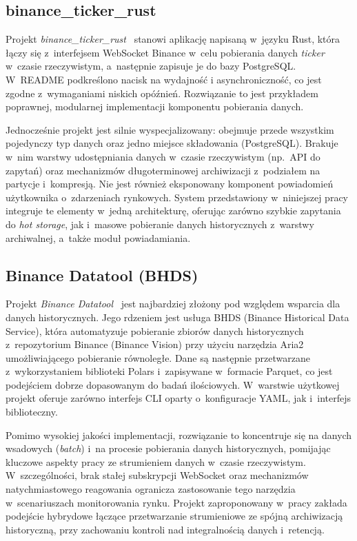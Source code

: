 \subsection{binance\_ticker\_rust}
\label{subsec:binance_ticker_rust}

Projekt \textit{binance\_ticker\_rust}~\cite{github_binance_ticker_rust} stanowi aplikację napisaną w~języku Rust,
która łączy się z~interfejsem WebSocket Binance w~celu pobierania danych \textit{ticker} w~czasie rzeczywistym,
a~następnie zapisuje je do bazy PostgreSQL\@.
W~README podkreślono nacisk na wydajność i asynchroniczność, co jest zgodne z~wymaganiami niskich opóźnień.
Rozwiązanie to jest przykładem poprawnej, modularnej implementacji komponentu pobierania danych.

Jednocześnie projekt jest silnie wyspecjalizowany: obejmuje przede wszystkim pojedynczy typ danych oraz jedno miejsce
składowania (PostgreSQL).
Brakuje w~nim warstwy udostępniania danych w~czasie rzeczywistym (np.\ API do zapytań) oraz mechanizmów
długoterminowej archiwizacji z~podziałem na partycje i~kompresją.
Nie jest również eksponowany komponent powiadomień użytkownika o~zdarzeniach rynkowych.
System przedstawiony w~niniejszej pracy integruje te elementy w~jedną architekturę, oferując zarówno szybkie zapytania do
\textit{hot storage}, jak i~masowe pobieranie danych historycznych z~warstwy archiwalnej, a~także moduł powiadamiania.

\subsection{Binance Datatool (BHDS)}
\label{subsec:binance-datatool-(bhds)}

Projekt \textit{Binance Datatool}~\cite{github_binance_datatool_bhds} jest najbardziej złożony pod względem wsparcia
dla danych historycznych.
Jego rdzeniem jest usługa BHDS (Binance Historical Data Service), która automatyzuje pobieranie zbiorów danych
historycznych z~repozytorium Binance (Binance Vision) przy użyciu narzędzia Aria2 umożliwiającego pobieranie równoległe.
Dane są następnie przetwarzane z~wykorzystaniem biblioteki Polars i~zapisywane w~formacie Parquet, co jest podejściem
dobrze dopasowanym do badań ilościowych.
W~warstwie użytkowej projekt oferuje zarówno interfejs CLI oparty o~konfiguracje YAML, jak i~interfejs biblioteczny.

Pomimo wysokiej jakości implementacji, rozwiązanie to koncentruje się na danych wsadowych (\textit{batch}) i~na procesie
pobierania danych historycznych, pomijając kluczowe aspekty pracy ze strumieniem danych w~czasie rzeczywistym.
W~szczególności, brak stałej subskrypcji WebSocket oraz mechanizmów natychmiastowego reagowania ogranicza zastosowanie
tego narzędzia w~scenariuszach monitorowania rynku.
Projekt zaproponowany w~pracy zakłada podejście hybrydowe łączące przetwarzanie strumieniowe ze spójną
archiwizacją historyczną, przy zachowaniu kontroli nad integralnością danych i~retencją.


